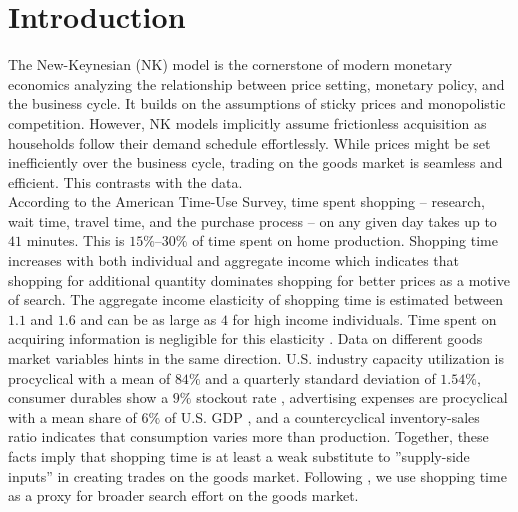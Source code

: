 \documentclass[12pt,3p,authoryear,review]{elsarticle}
\begin{document}
\newpage%
\setcounter{page}{1}%
\section{Introduction}
The New-Keynesian (NK) model is the cornerstone of modern monetary economics analyzing the relationship between price setting, monetary policy, and the business cycle. It builds on the assumptions of sticky prices and monopolistic competition. However, NK models implicitly assume frictionless acquisition as households follow their demand schedule effortlessly. While prices might be set inefficiently over the business cycle, trading on the goods market is seamless and efficient. This contrasts with the data.\\%
According to the American Time-Use Survey, time spent shopping -- research, wait time, travel time, and the purchase process -- on any given day takes up to $41$ minutes. This is $15\%$--$30\%$ of time spent on home production. Shopping time increases with both individual and aggregate income which indicates that shopping for additional quantity dominates shopping for better prices as a motive of search. The aggregate income elasticity of shopping time is estimated between $1.1$ and $1.6$ and can be as large as $4$ for high income individuals. Time spent on acquiring information is negligible for this elasticity \citep{petrosky-nadeauShoppingTime2016}. Data on different goods market variables hints in the same direction. U.S. industry capacity utilization is procyclical with a mean of $84\%$ and a quarterly standard deviation of $1.54\%$, consumer durables show a $9\%$ stockout rate \citep{khanInventoriesBusinessCycle2007}, advertising expenses are procyclical with a mean share of $6\%$ of U.S. GDP \citep{hallCyclicalResponseAdvertising2012}, and a countercyclical inventory-sales ratio \citep{den2024role} indicates that consumption varies more than production. Together, these facts imply that shopping time is at least a weak substitute to ''supply-side inputs'' in creating trades on the goods market. Following \cite{bai2025demand}, we use shopping time as a proxy for broader search effort on the goods market.\\%
\end{document}
